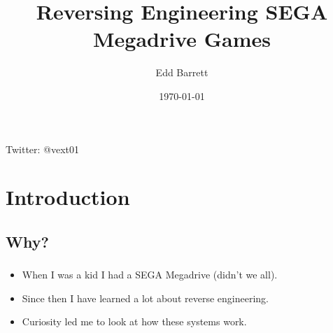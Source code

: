 \documentclass{beamer}
\title{Reversing Engineering SEGA Megadrive Games}
\author{Edd Barrett}
\date{\today}
\begin{document}

\begin{frame}[fragile]
  \titlepage
  \vspace{-4em}
  \begin{center}
  Twitter: @vext01
  \end{center}
\end{frame}


\section{Introduction}

\subsection{Why?}

\begin{frame}[fragile]


\frametitle{\insertsubsection}

\begin{itemize} 
\item When I was a kid I had a SEGA Megadrive (didn't we all).
\vfill
\item Since then I have learned a lot about reverse engineering.
\vfill
\item Curiosity led me to look at how these systems work.
\end{itemize}

\end{frame}

\end{document}
